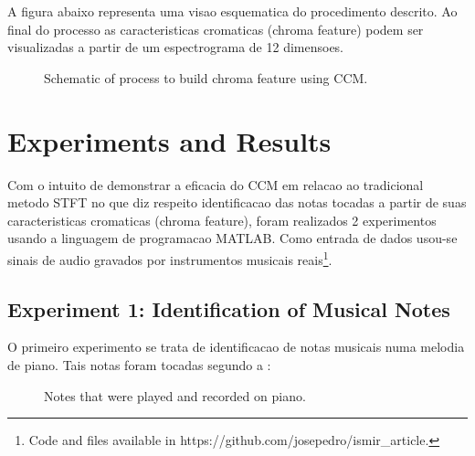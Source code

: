 \documentclass{article}
\begin{document}
	A figura abaixo representa uma visao esquematica do procedimento descrito. Ao final do processo as caracteristicas cromaticas (chroma feature) podem ser visualizadas a partir de um espectrograma de 12 dimensoes.

	\begin{figure}[h]
	 \centerline{}
	 \caption{Schematic of process to build chroma feature using CCM.}
	 \label{fig:schematic}
	\end{figure}


\section{Experiments and Results}

	Com o intuito de demonstrar a eficacia do CCM em relacao ao tradicional metodo STFT\cite{LabROSA} no que diz respeito identificacao das notas tocadas a partir de suas caracteristicas cromaticas (chroma feature),  foram realizados 2 experimentos usando a linguagem de programacao MATLAB. Como entrada de dados usou-se sinais de audio gravados por instrumentos musicais reais\footnote{Code and files available in https://github.com/josepedro/ismir\_article.}. 

	\subsection{Experiment 1: Identification of Musical Notes}

	O primeiro experimento se trata de identificacao de notas musicais numa melodia de piano. Tais notas foram tocadas segundo a : 

	\begin{figure}[h]
	 \centerline{}
	 \caption{Notes that were played and recorded on piano.}
	 \label{fig:1-notes}
	\end{figure}
\end{document}
